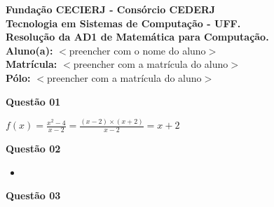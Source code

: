 \documentclass[10pt]{article}
\begin{document}
\noindent \textbf{Fundação CECIERJ - Consórcio CEDERJ}\\
\noindent \textbf{Tecnologia em Sistemas de Computação - UFF.}\\
\noindent \textbf{Resolução da AD1 de Matemática para Computação.}\\ %
\noindent \textbf{Aluno(a): } $<$preencher com o nome do aluno$>$ \\ %
\noindent \textbf{Matrícula: } $<$preencher com a matrícula do aluno$>$ \\ %
\noindent \textbf{Pólo: } $<$preencher com a matrícula do aluno$>$

\vspace{1.3cm}
\textbf{Questão 01}\\ %

\lipsum[3] %

\vspace{1.5em} %
{\large $f(x) = \frac{x^2 - 4}{x - 2} = \frac{(x - 2)\times(x + 2)}{x - 2} = x + 2$ }%

\vspace{1cm} %
\textbf{Questão 02}\\ %
\begin{itemize}
	\item[Item a] \lipsum[2] %
\end{itemize}

\vspace{1cm}
\textbf{Questão 03}\\ %

\lipsum[3] %
\end{document}

